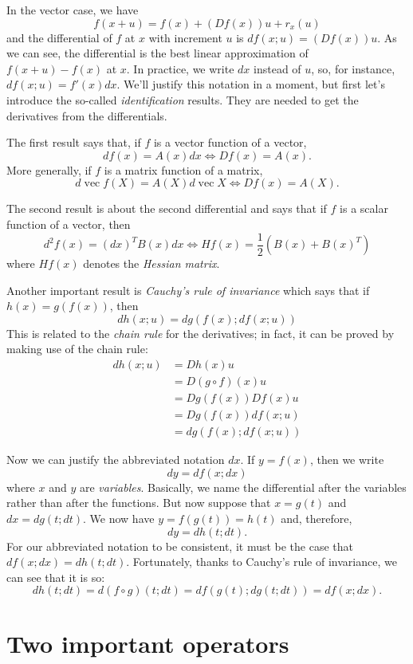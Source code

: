 \documentclass[a4paper,12pt]{article}
\begin{document}
In the vector case, we have
$$ f(x+u) = f(x) + (Df(x))u + r_x(u)
$$ and the differential of $f$ at $x$ with increment $u$ is $df(x;u) = (Df(x))u$. As we can see, the differential is the best linear approximation of $f(x+u) - f(x)$ at $x$. In practice, we write $dx$ instead of $u$, so, for instance, $df(x;u) = f'(x)dx$. We'll justify this notation in a moment, but first let's introduce the so-called \emph{identification} results. They are needed to get the derivatives from the differentials.

The first result says that, if $f$ is a vector function of a vector,
$$ df(x) = A(x)dx \iff Df(x) = A(x).
$$ More generally, if $f$ is a matrix function of a matrix,
$$ d\operatorname{vec}f(X) = A(X)d\operatorname{vec}X \iff Df(x) = A(X).
$$

The second result is about the second differential and says that if $f$ is a scalar function of a vector, then
$$ d^2 f(x) = (dx)^T B(x)dx \iff Hf(x) = \frac{1}{2}(B(x) + B(x)^T)
$$ where $Hf(x)$ denotes the \emph{Hessian matrix}.

Another important result is \emph{Cauchy's rule of invariance} which says that if $h(x) = g(f(x))$, then
$$ dh(x;u) = dg(f(x); df(x; u))
$$ This is related to the \emph{chain rule} for the derivatives; in fact, it can be proved by making use of the chain rule:
$$
\begin{align}
dh(x;u)
 &= Dh(x)u \\
 &= D(g\circ f)(x)u \\
 &= Dg(f(x))Df(x)u \\
 &= Dg(f(x))df(x;u) \\
 &= dg(f(x); df(x;u))
\end{align}
$$

Now we can justify the abbreviated notation $dx$. If $y = f(x)$, then we write
$$ dy = df(x; dx)
$$ where $x$ and $y$ are \emph{variables}. Basically, we name the differential after the variables rather than after the functions. But now suppose that $x = g(t)$ and $dx = dg(t; dt)$. We now have $y = f(g(t)) = h(t)$ and, therefore,
$$ dy = dh(t; dt).
$$ For our abbreviated notation to be consistent, it must be the case that $df(x; dx) = dh(t; dt)$. Fortunately, thanks to Cauchy's rule of invariance, we can see that it is so:
$$ dh(t;dt) = d(f\circ g)(t;dt) = df(g(t);dg(t;dt)) = df(x;dx). $$

\section{Two important operators}
\end{document}
